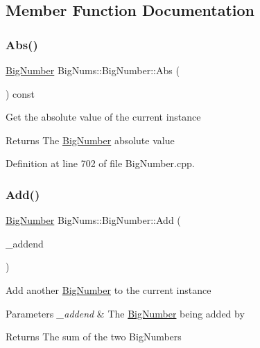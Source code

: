 \subsection{Member Function Documentation}
\mbox{\label{class_big_nums_1_1_big_number_ae4675cb61567802acb26e194d63ac454}} 
\subsubsection{\texorpdfstring{Abs()}{Abs()}}
{\footnotesize\ttfamily \mbox{\hyperlink{class_big_nums_1_1_big_number}{Big\+Number}} Big\+Nums\+::\+Big\+Number\+::\+Abs (\begin{DoxyParamCaption}{ }\end{DoxyParamCaption}) const}

Get the absolute value of the current instance \begin{DoxyReturn}{Returns}
The \mbox{\hyperlink{class_big_nums_1_1_big_number}{Big\+Number}} absolute value 
\end{DoxyReturn}


Definition at line 702 of file Big\+Number.\+cpp.

\mbox{\label{class_big_nums_1_1_big_number_aead85993ce069442f7b15cca8c81df39}} 
\subsubsection{\texorpdfstring{Add()}{Add()}}
{\footnotesize\ttfamily \mbox{\hyperlink{class_big_nums_1_1_big_number}{Big\+Number}} Big\+Nums\+::\+Big\+Number\+::\+Add (\begin{DoxyParamCaption}\item[{const \mbox{\hyperlink{class_big_nums_1_1_big_number}{Big\+Number}} \&}]{\+\_\+addend }\end{DoxyParamCaption})}

Add another \mbox{\hyperlink{class_big_nums_1_1_big_number}{Big\+Number}} to the current instance 
\begin{DoxyParams}{Parameters}
{\em \+\_\+addend} & The \mbox{\hyperlink{class_big_nums_1_1_big_number}{Big\+Number}} being added by \\
\hline
\end{DoxyParams}
\begin{DoxyReturn}{Returns}
The sum of the two Big\+Numbers 
\end{DoxyReturn}



